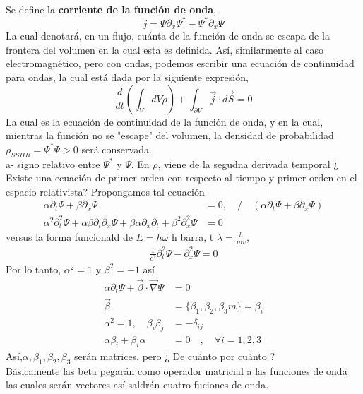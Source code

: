 \documentclass[../main.tex]{subfiles}
\begin{document}
  \\
Se define la \textbf{corriente de la función de onda},
\begin{equation}
  j= \Psi\partial_x\Psi^* - \Psi^*\partial_x\Psi 
\end{equation}
La cual denotará, en un flujo, cuánta de la función de onda se escapa de la frontera del volumen en la cual esta es definida. Así, similarmente al caso electromagnético, pero con ondas, podemos escribir una ecuación de continuidad para ondas, la cual está dada por la siguiente expresión,
\begin{equation}
  \frac{d}{dt}\left( \int_VdV\rho \right) + \int_{\partial V}\vec{j}\cdot d\vec{S} = 0
\end{equation}
La cual es la ecuación de continuidad de la función de onda,  y en la cual, mientras la función no se "escape" del volumen, la densidad de probabilidad $\rho_{SSHR}=\Psi^*\Psi>0$ será conservada. \\ 
a- signo relativo entre $\Psi^*$ y $\Psi$. En $\rho$, viene de la segudna derivada temporal  ¿ Existe una ecuación de primer orden con respecto al tiempo y primer orden en el espacio relativista? Propongamos tal ecuación
\begin{align*}
  \alpha \partial_t \Psi + \beta \partial_x \Psi  & = 0 , \quad / \quad \left( \alpha \partial_t \Psi + \beta \partial_x \Psi \right) \\
  \alpha^2 \partial^2_t\Psi + \alpha\beta \partial_t \partial_x \Psi + \beta \alpha \partial_x \partial_t + \beta^2 \partial^2_x \Psi  & = 0 
\end{align*}
versus la forma funcionald de $E=h\omega$ h barra,  t $\lambda = \frac{h}{mv}$, 
\begin{align*}
  \frac{1}{c^2} \partial^2_t\Psi - \partial^2_x \Psi = 0
\end{align*}
Por lo tanto, $\alpha^2=1$ y $\beta^2=-1$  así
\begin{align*}
 \alpha\partial_t \Psi + \vec{\beta} \cdot \vec{\nabla} \Psi &= 0 \\
  \vec{\beta} &= \{ \beta_1 , \beta_2 , \beta_3m\} = \beta_i \\ 
  \alpha^2=1 , \quad \beta_i \beta_j &= -\delta_{ij} \\
  \alpha\beta_i + \beta_i \alpha &= 0 \quad ,\quad \forall i = 1,2,3 
\end{align*}
Así,$\alpha, \beta_1, \beta_2, \beta_3$ serán matrices, pero ¿ De cuánto por cuánto ? \\ Básicamente las beta pegarán como operador matricial a las funciones de onda las cuales serán vectores  así saldrán cuatro fuciones de onda. \\
\end{document}
